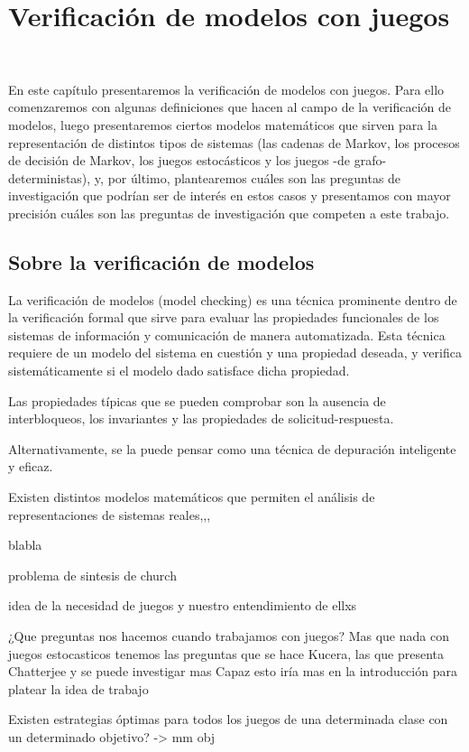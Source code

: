 \chapter{Verificación de modelos con juegos}
~\label{cap:modelos}

En este capítulo presentaremos la verificación de modelos con juegos. Para ello
comenzaremos con algunas definiciones que hacen al campo de la verificación de
modelos, luego presentaremos ciertos modelos matemáticos que sirven para la
representación de distintos tipos de sistemas (las cadenas de Markov, los
procesos de decisión de Markov, los juegos estocásticos y los juegos -de grafo-
deterministas), y, por último, plantearemos cuáles son las preguntas de
investigación que podrían ser de interés en estos casos y presentamos con mayor
precisión cuáles son las preguntas de investigación que competen a este
trabajo.

\section{Sobre la verificación de modelos}

La verificación de modelos (model checking) es una técnica prominente dentro de
la verificación formal que sirve para evaluar las propiedades funcionales de
los sistemas de información y comunicación de manera automatizada. Esta técnica
requiere de un modelo del sistema en cuestión y una propiedad deseada, y
verifica sistemáticamente si el modelo dado satisface dicha propiedad.

Las propiedades típicas que se pueden comprobar son la ausencia de
interbloqueos, los invariantes y las propiedades de solicitud-respuesta.

Alternativamente, se la puede pensar como una técnica de depuración inteligente
y eficaz.

Existen distintos modelos matemáticos que permiten el análisis de
representaciones de sistemas reales,,,

blabla

problema de sintesis de church

idea de la necesidad de juegos y nuestro entendimiento de ellxs

¿Que preguntas nos hacemos cuando trabajamos con juegos? Mas que nada con juegos estocasticos
tenemos las preguntas que se hace Kucera, las que presenta Chatterjee y se puede investigar mas
Capaz esto iría mas en la introducción para platear la idea de trabajo

Existen estrategias óptimas para todos los juegos de una determinada clase con
un determinado objetivo? -> mm obj

